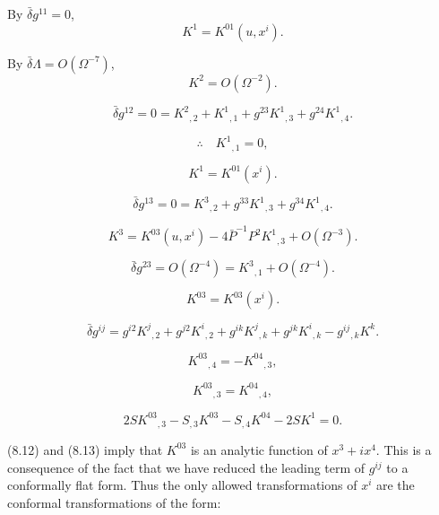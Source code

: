 By $\bar{\delta}g^{11}=0$,
\begin{equation}
K^1
=
K^{01}(u,x^i).
\tag{8.7}
\end{equation}


By $\bar{\delta}\Lambda=O(\Omega^{-7})$,
\begin{equation}
K^2=O(\Omega^{-2}).
\tag{8.8}
\end{equation}

\[
\bar{\delta}g^{12}
=0
=K^2{}_{,2}+K^1{}_{,1}
+g^{23}K^1{}_{,3}+g^{24}K^1{}_{,4}.
\]

\[
\therefore\quad K^1{}_{,1}=0,
\]

\begin{equation}
K^1=K^{01}(x^i).
\tag{8.9}
\end{equation}

\[
\bar{\delta}g^{13}
=0
=K^3{}_{,2}+g^{33}K^1{}_{,3}+g^{34}K^1{}_{,4}.
\]

\begin{equation}
K^3
=K^{03}(u,x^i)
-4\bar{P}^{-1}P^2K^1{}_{,3}
+O(\Omega^{-3}).
\tag{8.10}
\end{equation}

\[
\bar{\delta}g^{23}
=O(\Omega^{-4})
=K^3{}_{,1}+O(\Omega^{-4}).
\]

\begin{equation}
K^{03}=K^{03}(x^i).
\tag{8.11}
\end{equation}

\[
\bar{\delta}g^{ij}
=g^{i2}K^j{}_{,2}
+g^{j2}K^i{}_{,2}
+g^{ik}K^j{}_{,k}
+g^{jk}K^i{}_{,k}
-g^{ij}{}_{,k}K^k.
\]

\begin{equation}
K^{03}{}_{,4}=-K^{04}{}_{,3},
\tag{8.12}
\end{equation}

\begin{equation}
K^{03}{}_{,3}=K^{04}{}_{,4},
\tag{8.13}
\end{equation}

\begin{equation}
2S K^{03}{}_{,3}
-S_{,3}K^{03}
-S_{,4}K^{04}
-2S K^1
=0.
\tag{8.14}
\end{equation}

(8.12) and (8.13) imply that $K^{03}$ is an analytic function of
$x^3+i x^4$. This is a consequence of the fact that we have
reduced the leading term of $g^{ij}$ to a conformally flat
form. Thus the only allowed transformations of $x^i$ are the
conformal transformations of the form:

